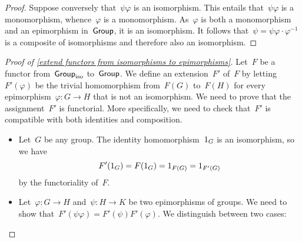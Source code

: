 \begin{itemize}
\begin{proof}
			Suppose conversely that~$ψ φ$ is an isomorphism.
			This entails that~$ψ φ$ is a monomorphism, whence~$φ$ is a monomorphism.
			As~$φ$ is both a monomorphism and an epimorphism in~$\mathsf{Group}$, it is an isomorphism.
			It follows that~$ψ = ψ φ ⋅ φ^{-1}$ is a composite of isomorphisms and therefore also an isomorphism.
		\end{proof}

		\begin{proof}[Proof of \cref{extend functors from isomorphisms to epimorphisms}]
			Let~$F$ be a functor from~$\mathsf{Group}_{\mathrm{iso}}$ to~$\mathsf{Group}$.
			We define an extension~$F'$ of~$F$ by letting~$F'(φ)$ be the trivial homomorphism from~$F(G)$ to~$F(H)$ for every epimorphism~$φ \colon G \to H$ that is not an isomorphism.
			We need to prove that the assignment~$F'$ is functorial.
			More specifically, we need to check that~$F'$ is compatible with both identities and composition.
			\begin{itemize}

				\item
					Let~$G$ be any group.
					The identity homomorphism~$1_G$ is an isomorphism, so we have
					\[
						F'(1_G)
						=
						F(1_G)
						=
						1_{F(G)}
						=
						1_{F'(G)}
					\]
					by the functoriality of~$F$.

				\item
					Let~$φ \colon G \to H$ and~$ψ \colon H \to K$ be two epimorphisms of groups.
					We need to show that~$F'(ψ φ) = F'(ψ) F'(φ)$.
					We distinguish between two cases:
			\end{itemize}
		\end{proof}

\end{itemize}



